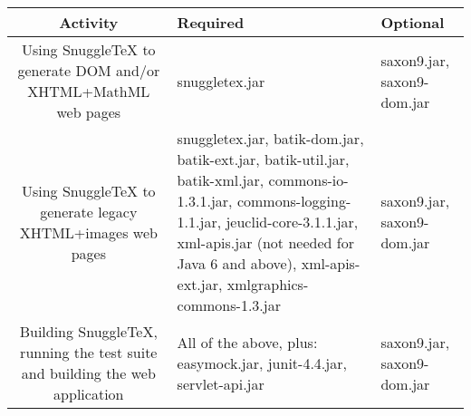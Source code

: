 \begin{tabular}{|c|l|l|}
\hline
Activity &
Required &
Optional \\
\hline
Using SnuggleTeX to generate DOM and/or XHTML+MathML web pages &
snuggletex.jar &
saxon9.jar, saxon9-dom.jar \\
\hline
Using SnuggleTeX to generate legacy XHTML+images web pages &
snuggletex.jar, batik-dom.jar, batik-ext.jar, batik-util.jar, batik-xml.jar, commons-io-1.3.1.jar, %
commons-logging-1.1.jar, jeuclid-core-3.1.1.jar, xml-apis.jar (not needed for Java 6 and above), %
 xml-apis-ext.jar, xmlgraphics-commons-1.3.jar &
saxon9.jar, saxon9-dom.jar \\
\hline
Building SnuggleTeX, running the test suite and building the web application &
All of the above, plus: easymock.jar, junit-4.4.jar, servlet-api.jar &
saxon9.jar, saxon9-dom.jar \\
\hline
\end{tabular}
